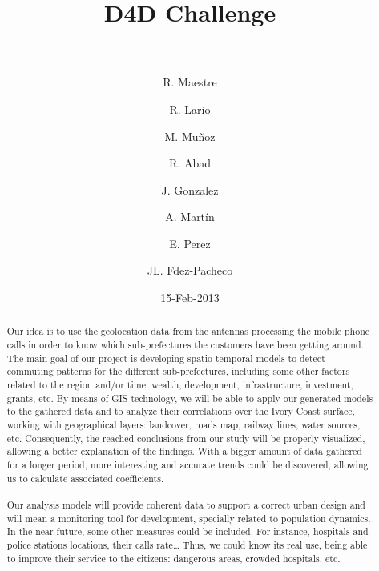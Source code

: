 \documentclass[a4paper,11pt]{article}
\begin{document}
\title{{\huge D4D Challenge} \\  \\ }

\author[1]{R. Maestre}
\author[1]{R. Lario}
\author[1]{M. Muñoz}
\author[1]{R. Abad}
\author[1]{J. Gonzalez}
\author[1]{A. Martín}
\author[2]{E. Perez}
\author[3]{JL. Fdez-Pacheco}



\date{15-Feb-2013}
\maketitle

\begin{abstract}
Our idea is to use the geolocation data from the antennas processing the mobile phone calls in order to know which sub-prefectures the customers have been getting around. The main goal of our project is developing spatio-temporal models to detect commuting patterns for the different sub-prefectures, including some other factors related to the region and/or time: wealth, development, infrastructure, investment, grants, etc.
By means of GIS technology, we will be able to apply our generated models to the gathered data and to analyze their correlations over the Ivory Coast surface, working with geographical layers: landcover, roads map, railway lines, water sources, etc. Consequently, the reached conclusions from our study will be properly visualized, allowing a better explanation of the findings. With a bigger amount of data gathered for a longer period, more interesting and accurate trends could be discovered, allowing us to calculate associated coefficients.
\\
\\
Our analysis models will provide coherent data to support a correct urban design and will mean a monitoring tool for development, specially related to population dynamics.
In the near future, some other measures could be included. For instance, hospitals and police stations locations, their calls rate… Thus, we could know its real use, being able to improve their service to the citizens: dangerous areas, crowded hospitals, etc.
\\
\\
\end{abstract}
\end{document}
